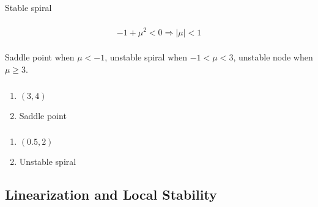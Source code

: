 \documentclass{article}
\begin{document}
\setcounter{subsubsection}{14}
\subsubsection{}

Stable spiral

\setcounter{subsubsection}{16}
\subsubsection{}

\[-1 + \mu^2 < 0 \Rightarrow |\mu| < 1\]

\setcounter{subsubsection}{18}
\subsubsection{}

Saddle point when $\mu < -1$, unstable spiral when $-1 < \mu < 3$, unstable node when $\mu \ge 3$.

\setcounter{subsubsection}{22}
\subsubsection{}

\begin{enumerate}
  \item $(3, 4)$

  \item Saddle point
\end{enumerate}

\setcounter{subsubsection}{24}
\subsubsection{}

\begin{enumerate}
  \item $(0.5, 2)$

  \item Unstable spiral
\end{enumerate}

\subsection{Linearization and Local Stability}

\subsubsection{}
\end{document}
